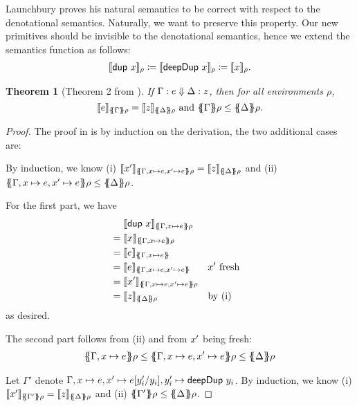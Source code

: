 \documentclass[preprint]{sigplanconf}
\newtheorem{theorem}{Theorem}
\theoremstyle{nonumberplain}
\newtheorem{proof}{Proof}
\begin{document}
Launchbury proves his natural semantics to be correct with respect to the denotational semantics. 
Naturally, we want to preserve this property. Our new primitives should be invisible to the denotational semantics, hence we extend the semantics function as follows:
\begin{align*}
\llbracket \text{\textsf{dup}}\ x \rrbracket_{\rho} \coloneqq \llbracket \text{\textsf{deepDup}}\ x \rrbracket_{\rho} \coloneqq \llbracket x \rrbracket_{\rho}.
\end{align*}

\begin{theorem}[Theorem 2 from \citep{launchbury}]
If $\Gamma : e \Downarrow \Delta : z$, then for all environments $\rho$,
\[
\dsem e {\esem \Gamma \rho} = \dsem z {\esem \Delta \rho}
\text{ and }
\esem \Gamma \rho \le \esem \Delta \rho.
\]
\end{theorem}
\begin{proof}
The proof in \citep{launchbury} is by induction on the derivation, the two additional cases are:

By induction, we know (i) $\dsem{\fresh x}{\esem{\Gamma, x \mapsto e, \fresh x \mapsto e} \rho} = \dsem{z}{\esem \Delta \rho}$ and (ii) $\esem{\Gamma, x \mapsto e, \fresh x \mapsto e} \rho \le \esem \Delta \rho$.

For the first part, we have 
\begin{align*}
&\phantom{{}={}}\dsem{\sDup x}{\esem{\Gamma, x\mapsto e}\rho}\\
&= \dsem{x}{\esem{\Gamma, x\mapsto e}\rho}\\
&= \dsem{e}{\esem{\Gamma, x\mapsto e}}\\
&= \dsem{e}{\esem{\Gamma, x\mapsto e, \fresh x \mapsto e}} && \text{$\fresh x$ fresh}\\
&= \dsem{\fresh x}{\esem{\Gamma, x\mapsto e, \fresh x \mapsto e}\rho} \\
&= \dsem{z}{\esem \Delta \rho} &&\text{by (i)}
\end{align*}
as desired.

The second part follows from (ii) and from $x'$ being fresh:
\begin{align*}
\esem{\Gamma, x\mapsto e}\rho \le \esem{\Gamma, x\mapsto e, \fresh x\mapsto e} \rho \le \esem{\Delta}\rho
\end{align*}

Let \mbox{$\Gamma'$} denote {$\Gamma, x\mapsto e, x'\mapsto e[y'_i/y_i], y'_i \mapsto \text{\textsf{deepDup}}\ y_i$}.
By induction, we know (i) $\dsem{\fresh x}{\esem{\Gamma'} \rho} = \dsem{z}{\esem \Delta \rho}$ and (ii) $\esem{\Gamma'} \rho \le \esem \Delta \rho$.


\end{proof}
\end{document}
